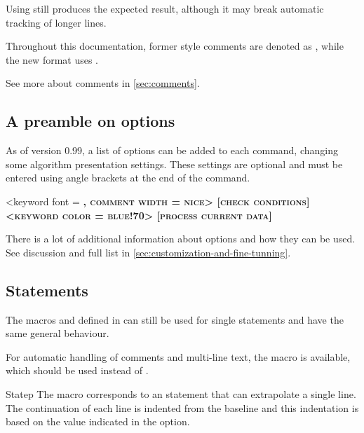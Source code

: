 \documentclass[a4paper, 11pt]{article}
\begin{document}
Using  still produces the expected result, although it may break automatic tracking of longer lines.

Throughout this documentation, former style comments are denoted as , while the new format uses .

See more about comments in \cref{sec:comments}.

\subsection{A preamble on options}\label{sec:a-preamble-on-options}
%
As of version 0.99, a list of options can be added to each command, changing some algorithm presentation settings. These settings are optional and must be entered using angle brackets at the end of the command.

\begin{PDExample}
    \begin{algorithmic}<keyword font = \scshape\bfseries, comment width = nice>
        [check conditions]
            <keyword color = blue!70>
                [process current data]
            \EndWhile
        \EndIf
    \end{algorithmic}
\end{PDExample}

There is a lot of additional information about options and how they can be used. See discussion and full list in \cref{sec:customization-and-fine-tunning}.

\subsection{Statements}\label{sec:statements}

The macros  and  defined in  can still be used for single statements and have the same general behaviour.

For automatic handling of comments and multi-line text, the  macro is available, which should be used instead of .

\begin{Macrodef}{Statep}{}{}
    The  macro corresponds to an statement that can extrapolate a single line. The continuation of each line is indented from the baseline and this indentation is based on the value indicated in the  option.

    \MacroOptionsText
\end{Macrodef}
\end{document}
